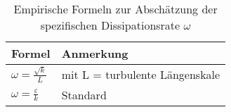 \begin{table}
  \centering
  \caption{Empirische Formeln zur Abschätzung der spezifischen Dissipationsrate \textit{$ \omega $}}
  \begin{tabular}{m{4cm}m{8cm}}
    \toprule
    	Formel & Anmerkung \\
    \midrule
    	 $ \omega = \frac{ \sqrt{k} }{ L } $ & mit L = turbulente Längenskale \\
		 $ \omega = \frac{ \varepsilon }{ k } $ & Standard \\		 
    \bottomrule
  \end{tabular}
\end{table}

\newpage